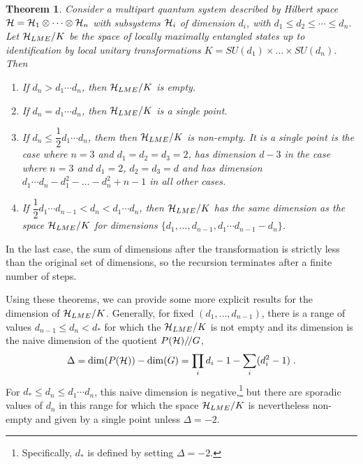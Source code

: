 \documentclass[12pt]{article}
\newtheorem{theorem}{Theorem}[section]
\theoremstyle{definition}
\newcommand{\be}{\begin{equation}}
\newcommand{\ee}{\end{equation}}
\newcommand{\GITquot}{/\!/}
\begin{document}
\begin{theorem}\label{thm.States}
Consider a multipart quantum system described by Hilbert space ${\cal H} = {\cal H}_1 \otimes \cdots \otimes {\cal H}_n$ with subsystems ${\cal H}_i$ of dimension $d_i$, with  $d_1 \le d_2 \leqslant \cdots \leqslant d_n$. Let ${\cal H}_{LME}/K$ be the space of locally maximally entangled states up to identification by local unitary transformations $K = SU(d_1) \times \dots \times SU(d_n)$. Then
\begin{enumerate}

\item
If $d_n > d_1 \cdots d_n$, then ${\cal H}_{LME}/K$ is empty.

\item
If $d_n = d_1 \cdots d_n$, then ${\cal H}_{LME}/K$ is a single point.

\item
If $d_n \le \dfrac{1}{2} d_1 \cdots d_n$, them
then ${\cal H}_{LME}/K$ is non-empty.
It is a single point is the case where $n = 3$ and $d_1 = d_2 = d_3 = 2$,
has dimension $d - 3$ in the case where $n = 3$ and $d_1 = 2$, $d_2 = d_3 = d$
and has dimension $d_1 \cdots d_n -
d_1^2 - \dots - d_n^2 + n - 1$ in all other cases.

\item
If $\dfrac{1}{2} d_1 \cdots d_{n-1} < d_n < d_1 \cdots d_n$,
then ${\cal H}_{LME}/K$ has the same dimension as the space ${\cal H}_{LME}/K$ for dimensions $\{d_1,\dots,d_{n-1}, d_1 \cdots d_{n-1} - d_n\}$.
\end{enumerate}
\end{theorem}
In the last case, the sum of dimensions after the transformation is strictly less than the original set of dimensions, so the recursion terminates after a finite number of steps.

Using these theorems, we can provide some more explicit results
for the dimension of ${\cal H}_{LME}/K$. Generally, for fixed
$(d_1,\dots, d_{n-1})$, there is a range of values $d_{n-1} \le d_n <
d_*$ for which the ${\cal H}_{LME}/K$ is not empty and its dimension
is the naive dimension of the quotient $P({\cal H})\GITquot G$,
\be
\Delta = {\rm dim}(P({\cal H})) - {\rm dim}(G) = \prod_i d_i - 1 -
\sum_i (d_i^2 - 1) \; .
\ee
For $d_* \le d_n \le d_1 \cdots d_n$,
this naive dimension is negative,\footnote{Specifically, $d_*$ is
defined by setting $\Delta = -2$.} but there are sporadic values of
$d_n$ in this range for which the space ${\cal H}_{LME}/K$ is
nevertheless non-empty and given by a single point unless $\Delta =
-2$.
\end{document}
